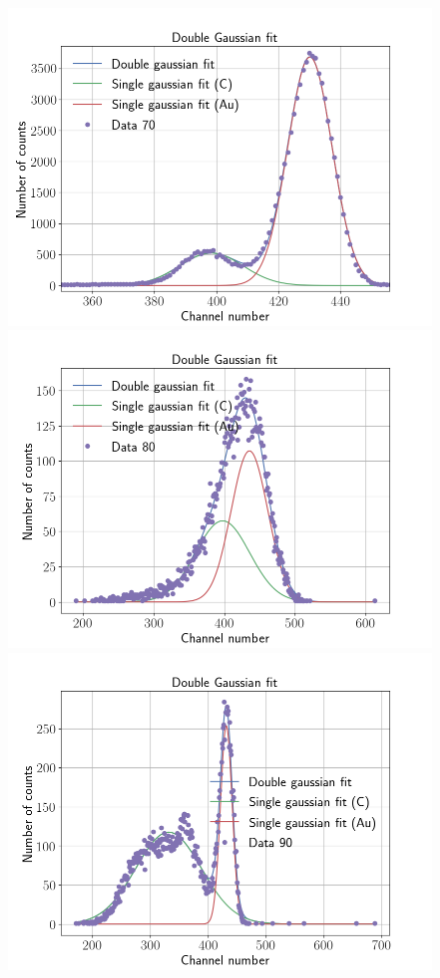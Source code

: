\begin{figure}
\includegraphics[width=0.99\columnwidth]{Data_70}
\includegraphics[width=0.99\columnwidth]{Data_80}
\includegraphics[width=0.99\columnwidth]{Data_90}

\end{figure}
